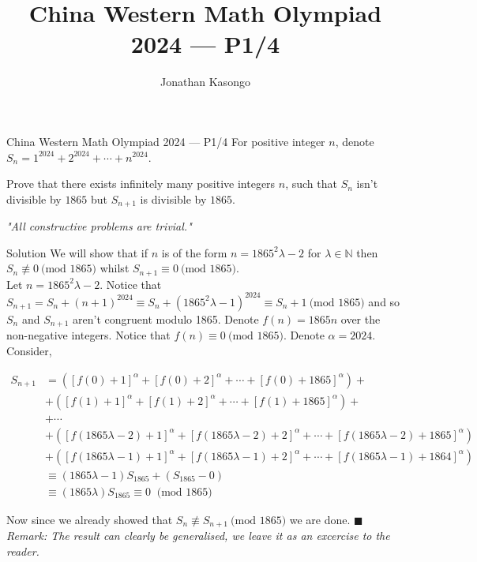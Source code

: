 \documentclass{article}
\author{Jonathan Kasongo}
\title{China Western Math Olympiad 2024 --- P1/4}
\begin{document}
\maketitle

\begin{problem}{China Western Math Olympiad 2024 --- P1/4}
For positive integer $n$, denote $S_n=1^{2024}+2^{2024}+ \cdots +n^{2024}$.
\vspace{0.2cm}

Prove that there exists infinitely many positive integers $n$, such that $S_n$ isn’t divisible by $1865$ but $S_{n+1}$ is divisible by $1865$.
\end{problem}

\textit{"All constructive problems are trivial."}

\begin{solution}{Solution}
We will show that if $n$ is of the form $n = 1865^2 \lambda - 2$ for
$\lambda \in \mathbb{N}$ then $S_n \nequiv 0 \ \text{(mod } 1865)$ whilst
$S_{n+1} \equiv 0 \ \text{(mod } 1865)$. \\

Let $n = 1865^2 \lambda - 2$.
Notice that
$S_{n+1} = S_n + (n+1)^{2024} \equiv S_n + (1865^2 \lambda - 1)^{2024}
\equiv S_n + 1 \ \text{(mod } 1865)$ and so $S_n$ and $S_{n+1}$ aren't
congruent modulo 1865. Denote $f(n) = 1865n$ over the non-negative
integers. Notice that $f(n) \equiv 0 \ \text{(mod } 1865)$.
Denote $\alpha = 2024$. Consider,

\[
\begin{aligned}
S_{n+1} &= \left([f(0)+1]^{\alpha} + [f(0)+2]^{\alpha} + \cdots + [f(0)+1865]^{\alpha}\right) + \\
&+ \left([f(1)+1]^{\alpha} + [f(1)+2]^{\alpha} +\cdots+ [f(1)+1865]^{\alpha}\right) + \\
&+ \cdots \\
&+ \left([f(1865\lambda-2)+1]^{\alpha} + [f(1865\lambda-2)+2]^{\alpha} + \cdots + [f(1865\lambda-2)+1865]^{\alpha} \right)\\
&+ \left([f(1865\lambda-1)+1]^{\alpha} + [f(1865\lambda-1)+2]^{\alpha} + \cdots + [f(1865\lambda-1)+1864]^{\alpha} \right)\\
&\equiv (1865\lambda-1)S_{1865} + (S_{1865} - 0)\\
&\equiv (1865\lambda)S_{1865} \equiv 0 \ \text{ (mod } 1865)
\end{aligned}
\]

Now since we already showed that $S_n \nequiv S_{n+1} \ \text{(mod } 1865)$
we are done. $\blacksquare$ \\

\textit{Remark: The result can clearly be generalised, we leave it as an
excercise to the reader.}
\end{solution}
\end{document}
